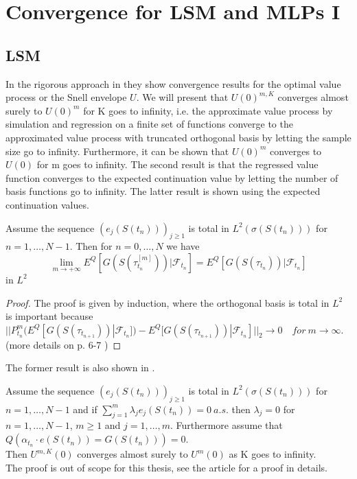 \section{Convergence for LSM and MLPs I}\label{Convergence}
\subsection{LSM}
In the rigorous approach in \parencite{analysisLSM} they show convergence results for the optimal value process or the Snell envelope $U$. We will present that $U(0)^{m,K}$ converges almost surely to $U(0)^{m}$ for K goes to infinity, i.e. the approximate value process by simulation and regression on a finite set of functions converge to the approximated value process with truncated orthogonal basis by letting the sample size go to infinity. Furthermore, it can be shown that $U(0)^{m}$ converges to $U(0)$ for m goes to infinity. The second result is that the regressed value function converges to the expected continuation value by letting the number of basis functions go to infinity. The latter result is shown using the expected continuation values.
\begin{theorem}\label{LSMConvergence1}
Assume the sequence $(e_{j}(S(t_n)))_{j\geq 1}$ is total in $L^2(\sigma(S(t_n)))$ for $n=1,\ldots,N-1$. Then for $n=0,\ldots,N$ we have
$$\lim_{m\to +\infty} E^Q[G(S(\tau_{t_n}^{[m]})) |\mathcal{F}_{t_n}]=E^Q[G(S(\tau_{t_n})) |\mathcal{F}_{t_n}]$$
in $L^2$
\begin{proof}
The proof is given by induction, where the orthogonal basis is total in $L^2$ is important because $||P^m_{t_n}(E^Q[G(S(\tau_{t_{n+1}}))|\mathcal{F}_{t_n}])- E^Q[G(S(\tau_{t_{n+1}}))|\mathcal{F}_{t_n}]||_2 \to 0 \quad for \ m \to \infty$.
(more details on p. 6-7 \parencite{analysisLSM})
\end{proof}
\end{theorem}

The former result is also shown in \parencite{analysisLSM}.
\begin{theorem}\label{LSMConvergence2}
Assume the sequence $(e_{j}(S(t_n)))_{j\geq 1}$ is total in $L^2(\sigma(S(t_n)))$ for $n=1,\ldots,N-1$ and if $\sum_{j=1}^{m} \lambda_j e_{j}(S(t_n))=0 \ a.s.$ then $\lambda_j=0$ for $n=1,\ldots,N-1$, $m\geq 1$ and $j=1,\ldots,m$. Furthermore assume that $Q(\alpha_{t_n} \cdot e(S(t_n))=G(S(t_n)))=0$.\\
Then $U^{m,K}(0)$ converges almost surely to $U^{m}(0)$ as K goes to infinity.\\
The proof is out of scope for this thesis, see the article \parencite{analysisLSM} for a proof in details. 
\end{theorem}

